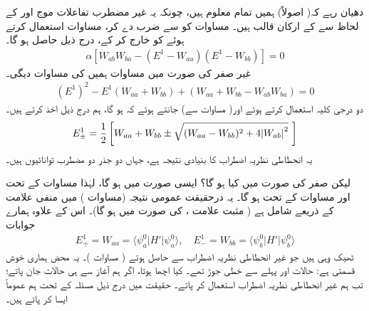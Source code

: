 دھیان رہے کہ( اصولاً) ہمیں تمام  معلوم ہیں، چونکہ یہ غیر مضطرب تفاعلات موج  اور  کے لحاظ سے  کے ارکان قالب ہیں۔ مساوات  کو  سے ضرب دے کر، مساوات  استعمال کرتے ہوئے  کو خارج کر کے، درج ذیل حاصل ہو گا۔
\begin{align}\label{مساوات_غیر_مضطرب_پہلا_اچھا_نتیجہ}
\alpha [W_{ab} W_{ba} - (E^1 - W_{aa}) (E^1 - W_{bb})] = 0
\end{align}
غیر صفر  کی صورت میں مساوات  ہمیں  کی مساوات دیگی۔ 
\begin{align}\label{مساوات_غیر_مضطرب_امتیازی_مساوات}
(E^1)^2 - E^1 (W_{aa} + W_{bb}) + (W_{aa} + W_{bb} - W_{ab} W_{ba}) = 0
\end{align}
دو درجی کلیہ استعمال کرتے ہوئے اور( مساوات  سے) جانتے ہوئے کہ  ہو گا، ہم درج ذیل اخذ کرتے ہیں۔
\begin{align}\label{مساوات_غیر_مضطرب_مضطرب_تونائیاں}
E_{\pm}^1 = \frac{1}{2} \left[W_{aa} + W_{bb} \pm \sqrt{(W_{aa} - W_{bb})^2 + 4 \abs{W_{ab}}^2} \,\,\right ]
\end{align}
یہ انحطاطی نظریہ اضطراب کا بنیادی نتیجہ ہے، جہاں دو جذر دو مضطرب توانائیوں ہیں۔

 لیکن صفر  کی صورت میں کیا ہو گا؟ ایسی صورت میں  ہو گا، لہٰذا مساوات  کے تحت  اور مساوات  کے تحت  ہو گا۔ یہ درحقیقت عمومی نتیجہ (مساوات ) میں منفی علامت کے ذریعے شامل ہے ( مثبت علامت ،  کی صورت میں ہو گا)۔ اس کے علاوہ ہمارے جوابات 
\begin{align*}
E_{+}^1 = W_{aa} = \langle \psi_a^0 | H' | \psi_a^0 \rangle, \quad E_{-}^1 = W_{bb} = \langle \psi_b^0 | H' | \psi_b^0 \rangle
\end{align*}
ٹھیک وہی ہیں جو غیر انحطاطی نظریہ اضطراب سے حاصل ہوتے ( مساوات )۔ یہ محض ہماری خوش قسمتی ہے: حالات  اور  پہلے سے  خطی جوڑ تھے۔ کیا اچھا ہوتا، اگر ہم آغاز سے ہی  حالات جان پاتے؛ تب ہم غیر انحطاطی نظریہ اضطراب استعمال کر پاتے۔ حقیقت میں درج ذیل مسئلہ کے تحت ہم عموماً ایسا کر پاتے ہیں۔

